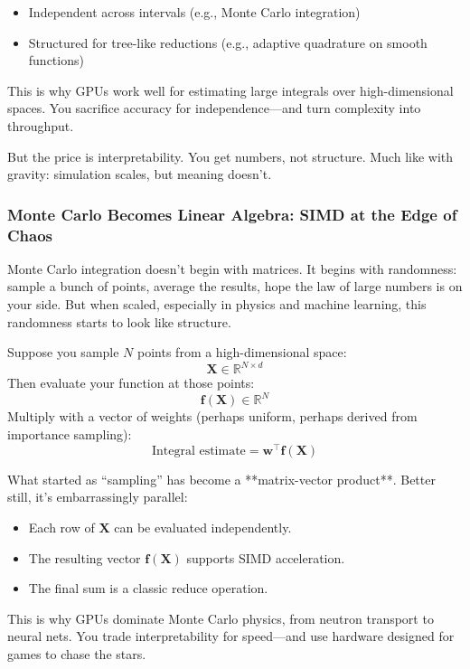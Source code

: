 \begin{itemize}
  \item Independent across intervals (e.g., Monte Carlo integration)
  \item Structured for tree-like reductions (e.g., adaptive quadrature on smooth functions)
\end{itemize}

This is why GPUs work well for estimating large integrals over high-dimensional spaces. You sacrifice accuracy for independence—and turn complexity into throughput.

But the price is interpretability. You get numbers, not structure. Much like with gravity: simulation scales, but meaning doesn’t.


\subsubsection{Monte Carlo Becomes Linear Algebra: SIMD at the Edge of Chaos}

Monte Carlo integration doesn't begin with matrices. It begins with randomness: sample a bunch of points, average the results, hope the law of large numbers is on your side. But when scaled, especially in physics and machine learning, this randomness starts to look like structure.

Suppose you sample \( N \) points from a high-dimensional space:  
\[
\mathbf{X} \in \mathbb{R}^{N \times d}
\]
Then evaluate your function at those points:  
\[
\mathbf{f}(\mathbf{X}) \in \mathbb{R}^{N}
\]
Multiply with a vector of weights (perhaps uniform, perhaps derived from importance sampling):  
\[
\text{Integral estimate} = \mathbf{w}^\top \mathbf{f}(\mathbf{X})
\]

What started as “sampling” has become a **matrix-vector product**. Better still, it’s embarrassingly parallel:
\begin{itemize}
  \item Each row of \( \mathbf{X} \) can be evaluated independently.
  \item The resulting vector \( \mathbf{f(X)} \) supports SIMD acceleration.
  \item The final sum is a classic reduce operation.
\end{itemize}

This is why GPUs dominate Monte Carlo physics, from neutron transport to neural nets. You trade interpretability for speed—and use hardware designed for games to chase the stars.

\vspace{1em}


